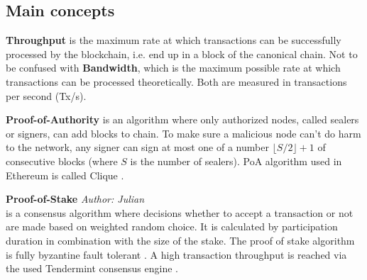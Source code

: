 \subsection{Main concepts}

\textbf{Throughput} is the maximum rate at which transactions can be successfully processed by the blockchain, i.e. end up in a block of the canonical chain. Not to be confused with \textbf{Bandwidth}, which is the maximum possible rate at which transactions can be processed theoretically. Both are measured in transactions per second (Tx/s).

\textbf{Proof-of-Authority} is an algorithm where only authorized nodes, called sealers or signers, can add blocks to chain. To make sure a malicious node can’t do harm to the network, any signer can sign at most one of a number $\lfloor S/2 \rfloor + 1$ of consecutive blocks (where $S$ is the number of sealers). PoA algorithm used in Ethereum is called Clique \cite{clique}.

\textbf{Proof-of-Stake}
\textit{Author: Julian} \\
is a consensus algorithm where decisions whether to accept a transaction or not are made based on weighted random choice. It is calculated by participation
duration in combination with the size of the stake. The proof of stake algorithm is fully byzantine fault tolerant \cite{pos}. A high transaction throughput is
reached via the used Tendermint consensus engine \cite{burrow_git}.
